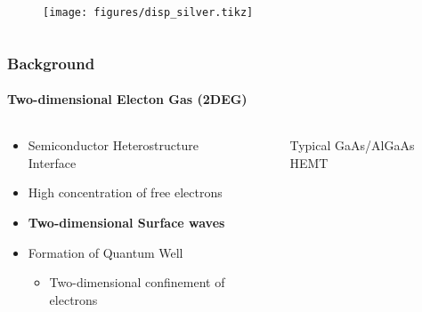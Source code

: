 \documentclass[mathserif,16pt,xcolor=table]{beamer}
\begin{document}
\begin{frame}
\begin{columns}[T]
\begin{column}[T]{.5\textwidth}
\begin{figure}
            \texttt{[image: figures/disp\_silver.tikz]}
            \label{fig:disp_silver}
          \end{figure}
      \end{column}
    \end{columns}
  \end{frame}
\begin{frame}
  \frametitle{Background}
  \framesubtitle{Two-dimensional Electon Gas (2DEG)}

  \begin{columns} %
    \begin{column}{.5\textwidth}
      \begin{minipage}[T][.1\textheight][c]{\linewidth}
        \begin{itemize}
          \item Semiconductor Heterostructure Interface
          \item High concentration of free electrons
          \item \textbf{Two-dimensional Surface waves}
          \item Formation of Quantum Well
          \begin{itemize}
            \item[]{Two-dimensional confinement of electrons}
          \end{itemize}
        \end{itemize}
      \end{minipage}
    \end{column}
    \begin{column}{.5\textwidth}
      \begin{figure}
        \def\svgwidth{\linewidth}
        
        \caption{Typical GaAs/AlGaAs HEMT}
      \end{figure}
      \end{column}%
    \end{columns}
  \end{frame}
\end{document}
